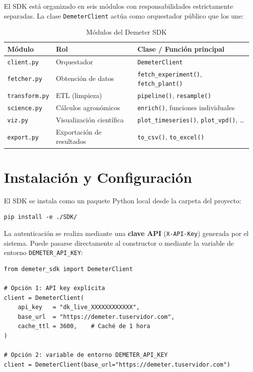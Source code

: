 El SDK está organizado en seis módulos con responsabilidades estrictamente separadas.
La clase \texttt{DemeterClient} actúa como orquestador público que los une:

\begin{table}[H]
    \centering
    \caption{Módulos del Demeter SDK}
    \begin{tabularx}{\textwidth}{llX}
        \toprule
        \textbf{Módulo}           & \textbf{Rol}              & \textbf{Clase / Función principal} \\
        \midrule
        \texttt{client.py}        & Orquestador               & \texttt{DemeterClient} \\
        \texttt{fetcher.py}       & Obtención de datos        & \texttt{fetch\_experiment()}, \texttt{fetch\_plant()} \\
        \texttt{transform.py}     & ETL (limpieza)            & \texttt{pipeline()}, \texttt{resample()} \\
        \texttt{science.py}       & Cálculos agronómicos      & \texttt{enrich()}, funciones individuales \\
        \texttt{viz.py}           & Visualización científica  & \texttt{plot\_timeseries()}, \texttt{plot\_vpd()}, … \\
        \texttt{export.py}        & Exportación de resultados & \texttt{to\_csv()}, \texttt{to\_excel()} \\
        \bottomrule
    \end{tabularx}
    \label{tab:sdk_modules}
\end{table}

\section{Instalación y Configuración}

El SDK se instala como un paquete Python local desde la carpeta del proyecto:

\begin{lstlisting}[style=trama, caption={Instalación del SDK en modo editable}]
pip install -e ./SDK/
\end{lstlisting}

La autenticación se realiza mediante una \textbf{clave API} (\texttt{X-API-Key}) generada
por el sistema. Puede pasarse directamente al constructor o mediante la variable de entorno
\texttt{DEMETER\_API\_KEY}:

\begin{lstlisting}[style=trama, caption={Inicialización del cliente}]
from demeter_sdk import DemeterClient

# Opción 1: API key explícita
client = DemeterClient(
    api_key   = "dk_live_XXXXXXXXXXXX",
    base_url  = "https://demeter.tuservidor.com",
    cache_ttl = 3600,    # Caché de 1 hora
)

# Opción 2: variable de entorno DEMETER_API_KEY
client = DemeterClient(base_url="https://demeter.tuservidor.com")
\end{lstlisting}

